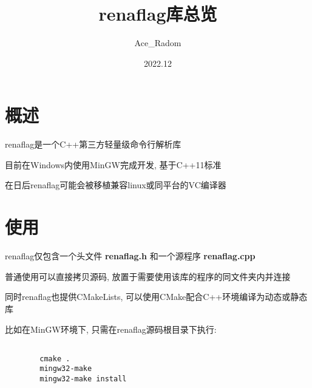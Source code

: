 \documentclass[12pt , a4paper , oneside]{ctexart}
\title{renaflag库总览}
\author{Ace\_Radom}
\date{2022.12}
\begin{document}
    \maketitle

    \newpage

    \section{概述}

        renaflag是一个C++第三方轻量级命令行解析库
        
        目前在Windows内使用MinGW完成开发, 基于C++11标准

        在日后renaflag可能会被移植兼容linux或同平台的VC编译器

    \section{使用}

        renaflag仅包含一个头文件 \textbf{renaflag.h} 和一个源程序 \textbf{renaflag.cpp}

        普通使用可以直接拷贝源码, 放置于需要使用该库的程序的同文件夹内并连接

        同时renaflag也提供CMakeLists, 可以使用CMake配合C++环境编译为动态或静态库

        比如在MinGW环境下, 只需在renaflag源码根目录下执行:

        \begin{lstlisting}
            
        cmake .
        mingw32-make
        mingw32-make install

        \end{lstlisting}

    
\end{document}
